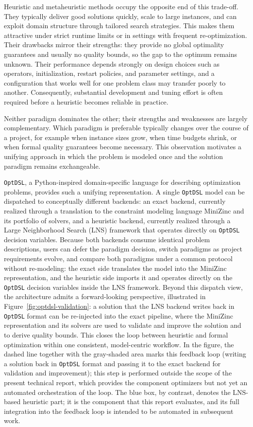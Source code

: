 \documentclass[11pt,a4paper]{article}
\begin{document}
Heuristic and metaheuristic methods occupy the opposite end of this trade-off.
They typically deliver good solutions quickly, scale to large instances, and can exploit domain structure through tailored search strategies.
This makes them attractive under strict runtime limits or in settings with frequent re-optimization.
Their drawbacks mirror their strengths: they provide no global optimality guarantees and usually no quality bounds, so the gap to the optimum remains unknown.
Their performance depends strongly on design choices such as operators, initialization, restart policies, and parameter settings, and a configuration that works well for one problem class may transfer poorly to another.
Consequently, substantial development and tuning effort is often required before a heuristic becomes reliable in practice.

Neither paradigm dominates the other; their strengths and weaknesses are largely complementary.
Which paradigm is preferable typically changes over the course of a project, for example when instance sizes grow, when time budgets shrink, or when formal quality guarantees become necessary.
This observation motivates a unifying approach in which the problem is modeled once and the solution paradigm remains exchangeable.

\texttt{OptDSL}, a Python-inspired domain-specific language for describing optimization problems, provides such a unifying representation.
A single \texttt{OptDSL} model can be dispatched to conceptually different backends:
an exact backend, currently realized through a translation to the constraint modeling language MiniZinc and its portfolio of solvers, and
a heuristic backend, currently realized through a Large Neighborhood Search (LNS) framework that operates directly on \texttt{OptDSL} decision variables.
Because both backends consume identical problem descriptions, users can defer the paradigm decision, switch paradigms as project requirements evolve, and compare both paradigms under a common protocol without re-modeling: the exact side translates the model into the MiniZinc representation, and the heuristic side imports it and operates directly on the \texttt{OptDSL} decision variables inside the LNS framework.
Beyond this dispatch view, the architecture admits a forward-looking perspective, illustrated in Figure~\ref{fig:optdsl-validation}: a solution that the LNS backend writes back in \texttt{OptDSL} format can be re-injected into the exact pipeline, where the MiniZinc representation and its solvers are used to validate and improve the solution and to derive quality bounds. This closes the loop between heuristic and formal optimization within one consistent, model-centric workflow.
In the figure, the dashed line together with the gray-shaded area marks this feedback loop (writing a solution back in \texttt{OptDSL} format and passing it to the exact backend for validation and improvement); this step is performed outside the scope of the present technical report, which provides the component optimizers but not yet an automated orchestration of the loop.
The blue box, by contrast, denotes the LNS-based heuristic part; it is the component that this report evaluates, and its full integration into the feedback loop is intended to be automated in subsequent work.
\end{document}
